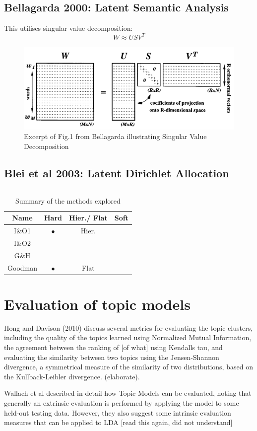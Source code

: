 \documentclass{article}
\begin{document}
\FloatBarrier
\subsection{Bellagarda 2000: Latent Semantic Analysis}

This utilises singular value decomposition:
$$W \approx USV^T $$
\begin{figure}
	\caption{Excerpt of Fig.1 from Bellagarda illustrating Singular Value Decomposition}
	\includegraphics[width=\textwidth]{Bellagarda_fig1_cropped}
\end{figure}

\subsection{Blei et al 2003: Latent Dirichlet Allocation}
$$$$


\begin{table}
	\begin{tabular}{|c|c|c|c|} %
	\hline
	Name 		& Hard 	& Hier./ Flat 	& Soft \\
	\hline
	I\&O1 	& $\bullet$  	& Hier.		&\\ 
	I\&O2 	& 		& 			&\\
	G\&H 		& 		& 			&\\
	Goodman	& $\bullet$	& Flat			& \\
	\hline
	\end{tabular}
\caption{Summary of the methods explored}
\end{table}

\section{Evaluation of topic models}
Hong and Davison (2010) discuss several metrics for evaluating the topic clusters, including the quality of the topics learned using Normalized Mutual Information, the agreement between the ranking of [of what] using Kendalls tau, and evaluating the similarity between two topics using the Jensen-Shannon divergence, a symmetrical measure of the similarity of two distributions, based on the Kullback-Leibler divergence. (elaborate).

Wallach et al described in detail how Topic Models can be evaluated, noting that generally an extrinsic evaluation is performed by applying the model to some held-out testing data. However, they also suggest some intrinsic evaluation measures that can be applied to LDA [read this again, did not understand]
\end{document}
